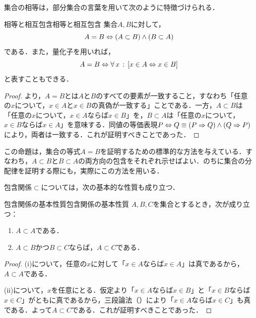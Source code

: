 集合の相等は，部分集合の言葉を用いて次のように特徴づけられる．

\begin{prop}{相等と相互包含}{相等と相互包含}
  集合$A,B$に対して，
  \[
    A = B
    \mathrel{\Leftrightarrow}
    (A \subset B) \land (B \subset A)
  \]
  である．また，量化子を用いれば，
  \[
    A = B
    \mathrel{\Leftrightarrow}
    \forall\, x \,:\, [ x \in A \mathrel{\Leftrightarrow} x \in B ]
  \]
  と表すこともできる．
\end{prop}

\begin{tleftbar}
  \begin{proof}
    より，$A = B$とは$A$と$B$のすべての要素が一致すること，すなわち「任意の$x$について，$x \in A$と$x \in B$の真偽が一致する」ことである．一方，$A \subset B$は「任意の$x$について，$x \in A$ならば$x \in B$」を，$B \subset A$は「任意の$x$について，$x \in B$ならば$x \in A$」を意味する．同値の等価表現$P \mathrel{\Leftrightarrow} Q \equiv (P \mathrel{\Rightarrow} Q) \land (Q \mathrel{\Rightarrow} P)$により，両者は一致する．これが証明すべきことであった．
  \end{proof}
\end{tleftbar}

この命題は，集合の等式$A = B$を証明するための標準的な方法を与えている．すなわち，$A \subset B$と$B \subset A$の両方向の包含をそれぞれ示せばよい．のちに集合の分配律を証明する際にも，実際にこの方法を用いる．

包含関係$\subset$については，次の基本的な性質も成り立つ．

\begin{prop}{包含関係の基本性質}{包含関係の基本性質}
  $A,B,C$を集合とするとき，次が成り立つ：
  \begin{enumerate}[label=(\roman*),leftmargin=3.2em]
    \item $A \subset A$である．
    \item $A \subset B$かつ$B \subset C$ならば，$A \subset C$である．
  \end{enumerate}
\end{prop}

\begin{tleftbar}
  \begin{proof}
    (i)について，任意の$x$に対して「$x \in A$ならば$x \in A$」は真であるから，$A \subset A$である．

    (ii)について，$x$を任意にとる．仮定より「$x \in A$ならば$x \in B$」と「$x \in B$ならば$x \in C$」がともに真であるから，三段論法（）により「$x \in A$ならば$x \in C$」も真である．よって$A \subset C$である．これが証明すべきことであった．
  \end{proof}
\end{tleftbar}

